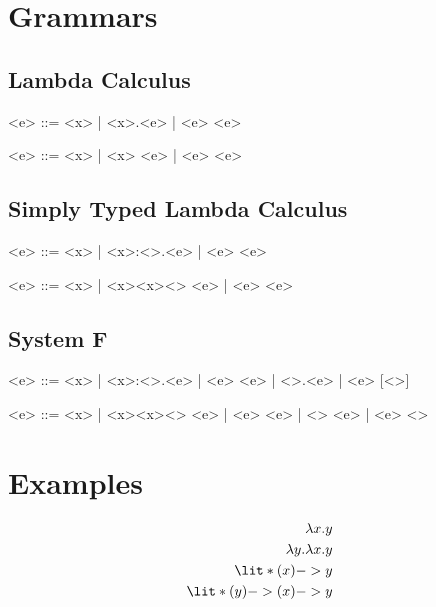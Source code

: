 \documentclass[11hpt]{article}
\begin{document}
\section{Grammars}

\subsection{Lambda Calculus}
\begin{grammar}
  <e> ::= <x> | <\lambda x>.<e> | <e> <e>
\end{grammar}

\begin{grammar}
  <e> ::= <x> | \lit*{(}<x>\lit*{) ->} <e> | <e> <e>
\end{grammar}

\subsection{Simply Typed Lambda Calculus}
\begin{grammar}
  <e> ::= <x> | <\lambda x>:<\tau>.<e> | <e> <e>
\end{grammar}

\begin{grammar}
  <e> ::= <x> | \lit*{(}<x><x>\lit*{,}<\tau>\lit*{);} <e> | <e> <e>
\end{grammar}

\subsection{System F}
\begin{grammar}
  <e> ::= <x> | <\lambda x>:<\tau>.<e> | <e> <e> | <\Lambda \alpha>.<e> | <e> [<\tau>]
\end{grammar}

\begin{grammar}
  <e> ::= <x>
       | \lit*{(}<x><x>\lit*{,}<\tau>\lit*{);} <e>
       | <e> <e>
       | \lit*{(}<\alpha>\lit*{) ->} <e>
       | <e> <\tau>
\end{grammar}

\section{Examples}

\begin{align*}
\lambda x.y \\
\lambda y.\lambda x.y \\
\lit*{(x) -> y} \\
\lit*{(y) -> (x) -> y}
\end{align*}
\end{document}
